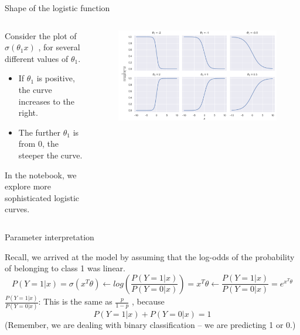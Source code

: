 \documentclass[aspectratio=169]{../latex_main/tntbeamer}  %
\begin{document}
	\begin{frame}{Shape of the logistic function}
	   
	   \begin{columns}
	    
	   \begin{column}{.5\textwidth}
	   Consider the plot of       $\sigma (\theta_1x)$      , for several different values of $\theta_1$. 
	   \begin{itemize}
	       \item If $\theta_1$ is positive, the curve increases to the right.
	       \item The further  $\theta_1$ is from 0, the steeper the curve.
	   \end{itemize}
	   In the notebook, we explore more sophisticated logistic curves.
	    \end{column}
	    \begin{column}{.5\textwidth}
	        \begin{figure}
	            \centering
	            \includegraphics[scale=.3]{Bild10}
	        \end{figure}
	    \end{column}
	    
	    \end{columns}
	\end{frame}
	
	
	\begin{frame}{Parameter interpretation}
	   
	   Recall, we arrived at the model by assuming that the log-odds of the probability of belonging to class 1 was linear.
	   \begin{equation*}
	       P(Y=1|x) = \sigma(x^T\theta) \leftarrow log\left(\frac{P(Y=1|x)}{P(Y=0|x)}\right) = x^T\theta \leftarrow \frac{P(Y=1|x)}{P(Y=0|x)} = e^{x^T\theta}
	   \end{equation*}
	   $\frac{P(Y=1|x)}{P(Y=0|x)}$: This is the same as     $\frac{p}{1-p}$          , because
        \begin{equation*}
            P(Y=1|x) + P(Y=0|x) = 1
        \end{equation*}
        (Remember, we are dealing with binary classification – we are predicting 1 or 0.)
	\end{frame}
	
\end{document}
